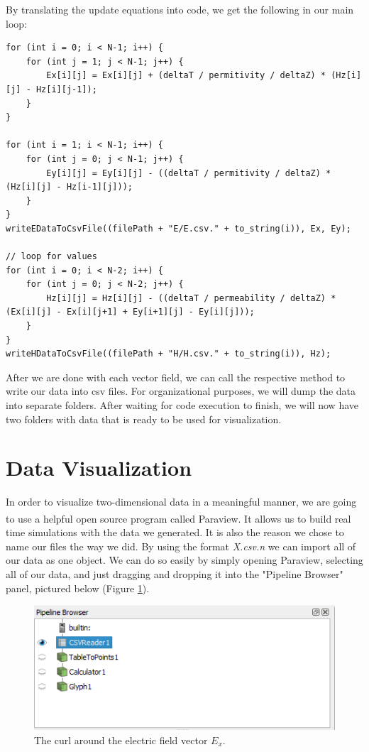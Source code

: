 By translating the update equations into code, we get the following in our main loop:

\begin{verbatim}
for (int i = 0; i < N-1; i++) {
	for (int j = 1; j < N-1; j++) {
		Ex[i][j] = Ex[i][j] + (deltaT / permitivity / deltaZ) * (Hz[i][j] - Hz[i][j-1]);
	}
}

for (int i = 1; i < N-1; i++) {
	for (int j = 0; j < N-1; j++) {
		Ey[i][j] = Ey[i][j] - ((deltaT / permitivity / deltaZ) * (Hz[i][j] - Hz[i-1][j]));
	}
}
writeEDataToCsvFile((filePath + "E/E.csv." + to_string(i)), Ex, Ey);

// loop for values
for (int i = 0; i < N-2; i++) {
	for (int j = 0; j < N-2; j++) {
		Hz[i][j] = Hz[i][j] - ((deltaT / permeability / deltaZ) * (Ex[i][j] - Ex[i][j+1] + Ey[i+1][j] - Ey[i][j]));
	}
}
writeHDataToCsvFile((filePath + "H/H.csv." + to_string(i)), Hz);
\end{verbatim}

After we are done with each vector field, we can call the respective method to write our data into csv files. For organizational purposes, we will dump the data into separate folders. After waiting for code execution to finish, we will now have two folders with data that is ready to be used for visualization.

\section{Data Visualization}

In order to visualize two-dimensional data in a meaningful manner, we are going to use a helpful open source program called Paraview\textsuperscript{\cite{paraview}}. It allows us to build real time simulations with the data we generated. It is also the reason we chose to name our files the way we did. By using the format \textit{X.csv.n} we can import all of our data as one object. We can do so easily by simply opening Paraview, selecting all of our data, and just dragging and dropping it into the "Pipeline Browser" panel, pictured below (Figure \ref{fig:paraviewFDTD2D1}).

\begin{figure}[h!]
	\centering
	\includegraphics[scale=0.6]{Figures/paraviewFDTD2D1}
	\decoRule
	\caption[2D TE Mode - $E_x$ vector curl]{The curl around the electric field vector $E_x$.}
	\label{fig:paraviewFDTD2D1}
\end{figure}

